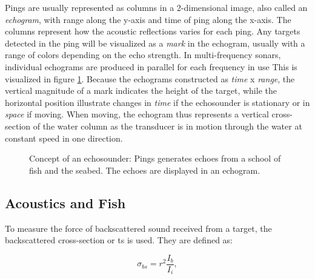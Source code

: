     Pings are usually represented as columns in a 2-dimensional image, also called an \textit{echogram}, with range along the y-axis and time of ping along the x-axis. The columns represent how the acoustic reflections varies for each ping. Any targets detected in the ping will be visualized as a \textit{mark} in the echogram, usually with a range of colors depending on the echo strength. In multi-frequency sonars, individual echograms are produced in parallel for each frequency in use This is visualized in figure \ref{echogram}. Because the echograms constructed as \textit{time} x \textit{range}, the vertical magnitude of a mark indicates the height of the target, while the horizontal position illustrate changes in \textit{time} if the echosounder is stationary or in \textit{space} if moving. When moving, the echogram thus represents a vertical cross-section of the water column as the transducer is in motion through the water at constant speed in one direction\cite{simmonds2008fisheries}.
    
    
    \begin{figure}[H]
        \centering
            
        \caption[Echosounder]{Concept of an echosounder: Pings generates echoes from a school of fish and the seabed. The echoes are displayed in an echogram.}
      	\medskip 
        \label{echogram}
    \end{figure}

    
\subsection{Acoustics and Fish}
    To measure the force of backscattered sound received from a target, the backscattered cross-section or \gls{ts} is used. They are defined as:
    
    \begin{equation}
        \sigma_{bs} = r^{2}\frac{I_{b}}{I_{i}},
    \end{equation}
    

